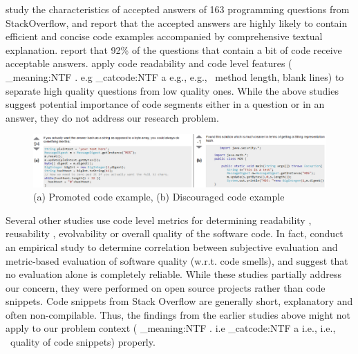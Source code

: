 \documentclass[conference]{IEEEtran}
\makeatletter
\newcommand\latinabbrev[1]{
  \peek_meaning:NTF . {%
    #1\@}%
  { \peek_catcode:NTF a {%
      #1., \@ }%
    {#1., \@}}}
\def\eg{\latinabbrev{e.g}}
\def\ie{\latinabbrev{i.e}}
\makeatother
\begin{document}
\citet{nasehi} study the characteristics of accepted answers of 163 programming questions from StackOverflow, and report that the accepted answers are highly likely to contain efficient and concise code examples accompanied by comprehensive textual explanation. \citet{nier} report that 92\% of the questions that contain a bit of code receive acceptable answers. \citet{qclassification} apply code readability and code level features (\eg\ method length, blank lines) to separate high quality questions from low quality ones. While the above studies suggest potential importance of code segments either in a question or in an answer, they do not address our research problem. 
\begin{figure}[!t]
\centering
\includegraphics[width=7in]{whole23}
\caption{(a) Promoted code example, (b) Discouraged code example}
\vspace{-.2cm}
\label{fig:example}
\end{figure}
Several other studies use code level metrics for determining readability \cite{readability}, reusability \cite{reusability}, evolvability \cite{subjective} or overall quality \cite{lochmann, survey} of the software code. 
In fact, \citet{subjective} conduct an empirical study to determine correlation between subjective evaluation and metric-based evaluation of software quality (w.r.t. code smells), and suggest that no evaluation alone is completely reliable. While these studies partially address our concern, they were performed on open source projects rather than code snippets. Code snippets from Stack Overflow are generally short, explanatory and often non-compilable. Thus, the findings from the earlier studies above might not apply to our problem context (\ie\ quality of code snippets) properly.     
\end{document}

